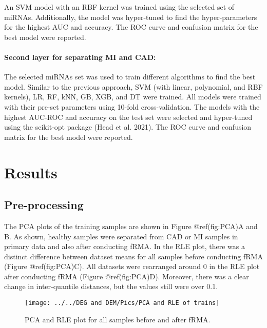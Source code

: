 \documentclass[smallextended]{svjour3}       %
\begin{document}
An SVM model with an RBF kernel was trained using the selected set of
miRNAs. Additionally, the model was hyper-tuned to find the
hyper-parameters for the highest AUC and accuracy. The ROC curve and
confusion matrix for the best model were reported.

\hypertarget{second-layer-for-separating-mi-and-cad}{%
\paragraph{Second layer for separating MI and
CAD:}\label{second-layer-for-separating-mi-and-cad}}

The selected miRNAs set was used to train different algorithms to find
the best model. Similar to the previous approach, SVM (with linear,
polynomial, and RBF kernels), LR, RF, kNN, GB, XGB, and DT were trained.
All models were trained with their pre-set parameters using 10-fold
cross-validation. The models with the highest AUC-ROC and accuracy on
the test set were selected and hyper-tuned using the scikit-opt package
(Head et al. 2021). The ROC curve and confusion matrix for the best
model were reported.

\hypertarget{results}{%
\section{Results}\label{results}}

\hypertarget{pre-processing-1}{%
\subsection{Pre-processing}\label{pre-processing-1}}

The PCA plots of the training samples are shown in Figure @ref(fig:PCA)A
and B. As shown, healthy samples were separated from CAD or MI samples
in primary data and also after conducting fRMA. In the RLE plot, there
was a distinct difference between dataset means for all samples before
conducting fRMA (Figure @ref(fig:PCA)C). All datasets were rearranged
around 0 in the RLE plot after conducting fRMA (Figure @ref(fig:PCA)D).
Moreover, there was a clear change in inter-quantile distances, but the
values still were over 0.1.

\begin{figure}
\texttt{[image: ../../DEG and DEM/Pics/PCA and RLE of trains]} \caption{PCA and RLE plot for all samples before and after fRMA.}\label{fig:PCA}
\end{figure}
\end{document}
